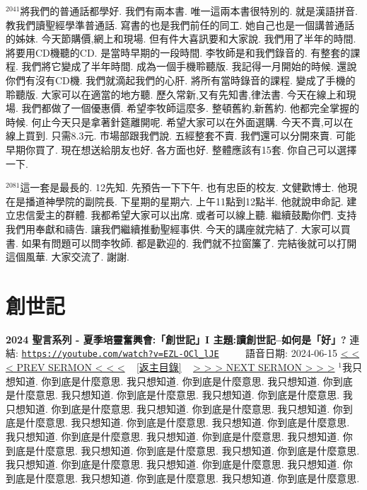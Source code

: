 \documentclass{book}
\begin{document}
$^{2041}$將我們的普通話都學好.
我們有兩本書.
唯一這兩本書很特別的.
就是漢語拼音.
教我們讀聖經學準普通話.
寫書的也是我們前任的同工.
她自己也是一個講普通話的姊妹.
今天節購價,網上和現場.
但有件大喜訊要和大家說.
我們用了半年的時間.
將要用CD機聽的CD.
是當時早期的一段時間.
李牧師是和我們錄音的.
有整套的課程.
我們將它變成了半年時間.
成為一個手機聆聽版.
我記得一月開始的時候.
還說你們有沒有CD機.
我們就滴起我們的心肝.
將所有當時錄音的課程.
變成了手機的聆聽版.
大家可以在適當的地方聽.
歷久常新,又有先知書,律法書.
今天在線上和現場.
我們都做了一個優惠價.
希望李牧師這麼多.
整頓舊約,新舊約.
他都完全掌握的時候.
何止今天只是拿著針筵離開呢.
希望大家可以在外面選購.
今天不賣,可以在線上買到.
只需8.3元.
市場部跟我們說.
五經整套不賣.
我們還可以分開來賣.
可能早期你買了.
現在想送給朋友也好.
各方面也好.
整體應該有15套.
你自己可以選擇一下.

$^{2081}$這一套是最長的.
12先知.
先預告一下下午.
也有忠臣的校友.
文健歡博士.
他現在是播道神學院的副院長.
下星期的星期六.
上午11點到12點半.
他就說申命記.
建立忠信愛主的群體.
我都希望大家可以出席.
或者可以線上聽.
繼續鼓勵你們.
支持我們用奉獻和禱告.
讓我們繼續推動聖經事供.
今天的講座就完結了.
大家可以買書.
如果有問題可以問李牧師.
都是歡迎的.
我們就不拉窗簾了.
完結後就可以打開這個風華.
大家交流了.
謝謝.
\newpage



\section{創世記}
\label{sec:EZL_OCl_lJE}
\textbf{2024 聖言系列 - 夏季培靈奮興會:「創世記」I 主題:讀創世記–如何是「好」?}
\newline
\newline
連結: \href{https://youtube.com/watch?v=EZL-OCl_lJE}{\texttt{https://youtube.com/watch?v=EZL-OCl\_lJE}} ~~~~ 語音日期: 2024-06-15
\newline
\newline
\hyperref[sec:dqXyjOETQK4]{\small{< < < PREV SERMON < < <}}
~
\hyperref[sec:index]{\small{[返主目錄]}}
~
\hyperref[sec:R54GUORH3eY]{\small{> > > NEXT SERMON > > >}}
\newline
\newline
$^{1}$我只想知道.
你到底是什麼意思.
我只想知道.
你到底是什麼意思.
我只想知道.
你到底是什麼意思.
我只想知道.
你到底是什麼意思.
我只想知道.
你到底是什麼意思.
我只想知道.
你到底是什麼意思.
我只想知道.
你到底是什麼意思.
我只想知道.
你到底是什麼意思.
我只想知道.
你到底是什麼意思.
我只想知道.
你到底是什麼意思.
我只想知道.
你到底是什麼意思.
我只想知道.
你到底是什麼意思.
我只想知道.
你到底是什麼意思.
我只想知道.
你到底是什麼意思.
我只想知道.
你到底是什麼意思.
我只想知道.
你到底是什麼意思.
我只想知道.
你到底是什麼意思.
我只想知道.
你到底是什麼意思.
我只想知道.
你到底是什麼意思.
我只想知道.
你到底是什麼意思.
\end{document}

